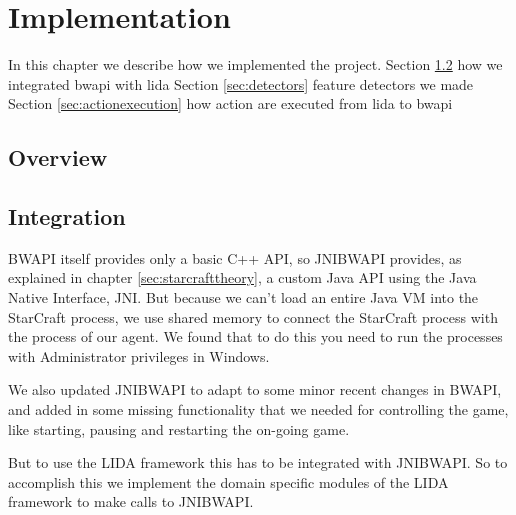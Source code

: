 
\chapter{Implementation}
In this chapter we describe how we implemented the project.
Section \ref{sec:integration} how we integrated bwapi with lida
Section \ref{sec:detectors} feature detectors we made
Section \ref{sec:actionexecution} how action are executed from lida to bwapi

\section{Overview} 
\label{sec:overview}

\section{Integration}
\label{sec:integration}
BWAPI itself provides only a basic C++ API, so JNIBWAPI provides, as explained in chapter \ref{sec:starcrafttheory}, a custom Java API using the Java Native Interface, JNI.\cite{jni} But because we can't load an entire Java VM into the StarCraft process, we use shared memory to connect the StarCraft process with the process of our agent. We found that to do this you need to run the processes with Administrator privileges in Windows.

We also updated JNIBWAPI to adapt to some minor recent changes in BWAPI, and added in some missing functionality that we needed for controlling the game, like starting, pausing and restarting the on-going game.

But to use the LIDA framework this has to be integrated with JNIBWAPI. So to accomplish this we implement the domain specific modules of the LIDA framework to make calls to JNIBWAPI. 


